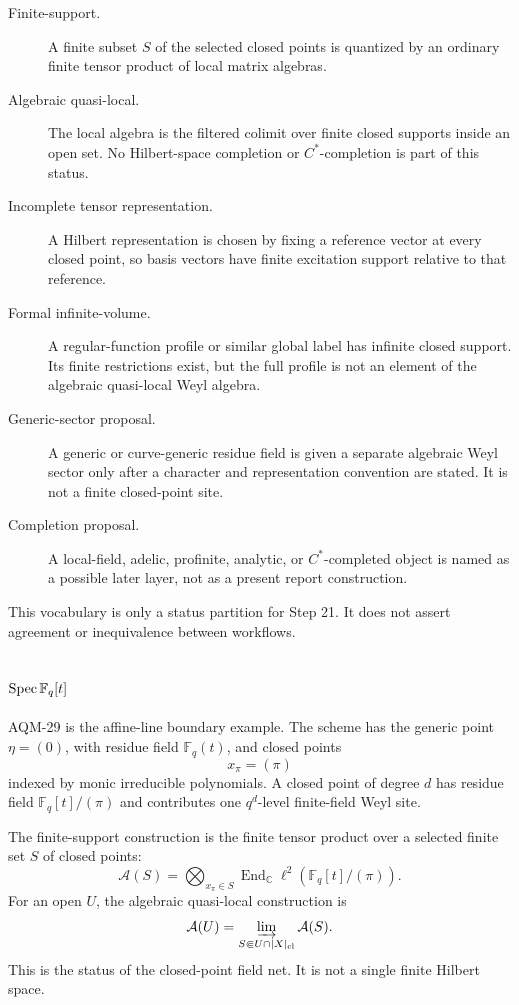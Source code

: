 \begin{description}
\item[Finite-support.] A finite subset \(S\) of the selected closed points is
  quantized by an ordinary finite tensor product of local matrix algebras.
\item[Algebraic quasi-local.] The local algebra is the filtered colimit over
  finite closed supports inside an open set.  No Hilbert-space completion or
  \(C^*\)-completion is part of this status.
\item[Incomplete tensor representation.] A Hilbert representation is chosen by
  fixing a reference vector at every closed point, so basis vectors have
  finite excitation support relative to that reference.
\item[Formal infinite-volume.] A regular-function profile or similar global
  label has infinite closed support.  Its finite restrictions exist, but the
  full profile is not an element of the algebraic quasi-local Weyl algebra.
\item[Generic-sector proposal.] A generic or curve-generic residue field is
  given a separate algebraic Weyl sector only after a character and
  representation convention are stated.  It is not a finite closed-point site.
\item[Completion proposal.] A local-field, adelic, profinite, analytic, or
  \(C^*\)-completed object is named as a possible later layer, not as a
  present report construction.
\end{description}

This vocabulary is only a status partition for Step 21.  It does not assert
agreement or inequivalence between workflows.

\subsection{\texorpdfstring{\(\operatorname{Spec}\mathbb F_q[t]\)}{Spec Fq[t]}}

AQM-29 is the affine-line boundary example.  The scheme has the generic point
\(\eta=(0)\), with residue field \(\mathbb F_q(t)\), and closed points
\[
  x_\pi=(\pi)
\]
indexed by monic irreducible polynomials.  A closed point of degree \(d\)
has residue field \(\mathbb F_q[t]/(\pi)\) and contributes one
\(q^d\)-level finite-field Weyl site.

The finite-support construction is the finite tensor product over a selected
finite set \(S\) of closed points:
\[
  \mathcal A(S)=
  \bigotimes_{x_\pi\in S}
  \operatorname{End}_{\mathbb C}\ell^2(\mathbb F_q[t]/(\pi)).
\]
For an open \(U\), the algebraic quasi-local construction is
\[
  \mathcal A(U)=
  \varinjlim_{S\Subset U\cap |X|_{\rm cl}}\mathcal A(S).
\]
This is the status of the closed-point field net.  It is not a single finite
Hilbert space.

